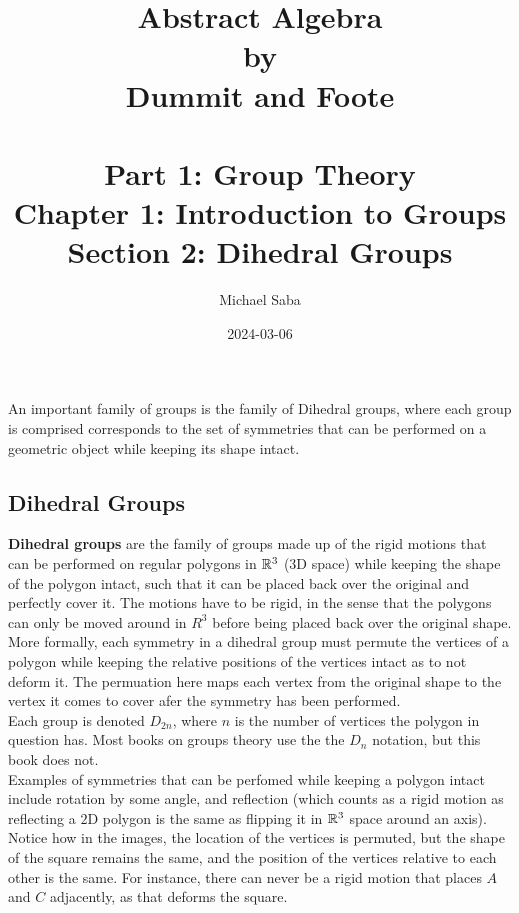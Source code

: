 \documentclass[12pt]{article}
\title{%
    \Huge Abstract Algebra \\
    \large by \\
    \Large Dummit and Foote \\~\\
    \huge Part 1: Group Theory \\
    \LARGE Chapter 1: Introduction to Groups \\
    \Large Section 2: Dihedral Groups
}
\date{2024-03-06}
\author{Michael Saba}
\begin{document}
    \maketitle
    \newpage
    \setlength{\parindent}{0pt}

    An important family of groups
    is the family of Dihedral groups,
    where each group is comprised corresponds to the set of symmetries 
    that can be performed on a geometric object
    while keeping its shape intact. \\

    \subsection*{Dihedral Groups}

    \textbf{Dihedral groups} are the family of groups
    made up of the rigid motions that can be performed on regular polygons
    in $\mathbb{R}^3$ ($3$D space)
    while keeping the shape of the polygon intact,
    such that it can be placed back over the original
    and perfectly cover it.
    The motions have to be rigid,
    in the sense that the polygons can only be moved around in $R^3$
    before being placed back over the original shape. \\
    More formally,
    each symmetry in a dihedral group must permute the vertices of a polygon
    while keeping the relative positions of the vertices intact as to
    not deform it.
    The permuation here maps each vertex from the original shape
    to the vertex it comes to cover afer the symmetry has been performed. \\

    Each group is denoted $D_{2n}$,
    where $n$ is the number of vertices the polygon in question has.
    Most books on groups theory use the the $D_n$ notation,
    but this book does not. \\

    Examples of symmetries that can be perfomed
    while keeping a polygon intact include rotation by some angle,
    and reflection
    (which counts as a rigid motion as reflecting a $2$D polygon
    is the same as flipping it in $\mathbb{R}^3$ space around an axis). \\ 
    Notice how in the images,
    the location of the vertices is permuted,
    but the shape of the square remains the same,
    and the position of the vertices relative to each other is the same.
    For instance, there can never be a rigid motion that places
    $A$ and $C$ adjacently,
    as that deforms the square. \\
\end{document}
